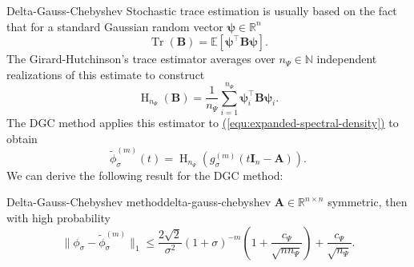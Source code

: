 \documentclass[final, leqno, 12pt]{beamer}
\newcommand{\mtx}[1]{\boldsymbol{#1}}
\newcommand{\vct}[1]{\boldsymbol{#1}}
\DeclareMathOperator{\Tr}{Tr}
\DeclareMathOperator{\Hutch}{H}
\newcommand{\refequ}[1]{\hyperref[#1]{\textcolor{linkcolor}{(\ref*{#1})}}}
\let\oldcite\cite
\renewcommand{\cite}[2][]{\textcolor{linkcolor}{\oldcite{#2}}}
\begin{document}
\begin{frame}[t]

\vspace{15pt}
\begin{columns}[t]

    \begin{column}{0.3\paperwidth}

        \begin{block}{Delta-Gauss-Chebyshev}
            Stochastic trace estimation is usually based on the fact that
            for a standard Gaussian random vector $\vct{\psi} \in \mathbb{R}^n$
            \begin{equation}
                \Tr(\mtx{B}) = \mathbb{E}\left[\vct{\psi}^{\top} \mtx{B} \vct{\psi}\right].
            \end{equation}
            The Girard-Hutchinson's trace estimator averages over $n_{\Psi} \in \mathbb{N}$
            independent realizations of this estimate to construct
            \begin{equation}
                \Hutch_{n_{\Psi}}(\mtx{B}) = \frac{1}{n_{\Psi}} \sum_{i=1}^{n_{\Psi}} \vct{\psi}_i^{\top} \mtx{B} \vct{\psi}_i.
            \end{equation}
            The \gls{DGC} method \cite{lin2017randomized} applies this
            estimator to \refequ{equ:expanded-spectral-density} to obtain
            \begin{equation}
                \boxed{\widetilde{\phi}_{\sigma}^{(m)}(t) = \Hutch_{n_{\Psi}}(g_{\sigma}^{(m)}(t\mtx{I}_n - \mtx{A})).}
            \end{equation}
            We can derive the following result for the \gls{DGC} method:
            \begin{thm}{Delta-Gauss-Chebyshev method}{delta-gauss-chebyshev}
                $\mtx{A} \in \mathbb{R}^{n \times n}$ symmetric, then with high probability
                \begin{equation*}
                    \lVert \phi_{\sigma} - \widetilde{\phi}_{\sigma}^{(m)}\rVert _1
                    \leq \frac{2\sqrt{2}}{\sigma^2} (1 + \sigma)^{-m} \left( 1 +  \frac{c_{\Psi}}{\sqrt{n n_{\Psi}}} \right) + \frac{c_{\Psi}}{\sqrt{n_{\Psi}}}.
                \end{equation*}
            \end{thm}
        \end{block}


\end{column}
\end{columns}
\end{frame}
\end{document}
